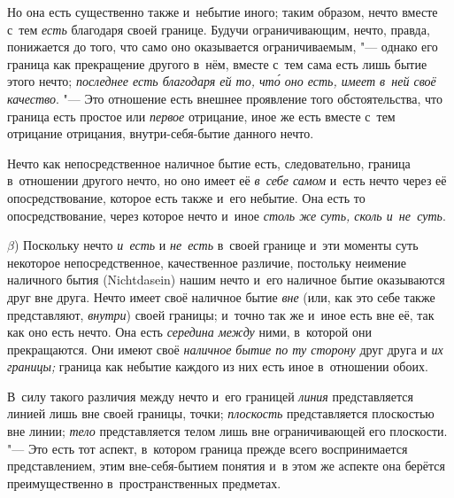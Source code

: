 Но она есть существенно также и~небытие иного; таким образом, нечто вместе
с~тем {\em есть} благодаря своей границе. Будучи ограничивающим, нечто, правда,
понижается до того, что само оно оказывается ограничиваемым, "--- однако его
граница как прекращение другого в~нём, вместе с~тем сама есть лишь бытие этого
нечто; {\em последнее есть благодаря ей то, чт\'{о} оно есть, имеет в~ней своё
качество}. "--- Это отношение есть внешнее проявление того обстоятельства, что
граница есть простое или {\em первое} отрицание, иное же есть вместе с~тем
отрицание отрицания, внутри-себя-бытие данного нечто.

Нечто как непосредственное наличное бытие есть, следовательно, граница
в~отношении другого нечто, но оно имеет её {\em в~себе самом} и~есть нечто
через её опосредствование, которое есть также и~его небытие. Она есть то
опосредствование, через которое нечто и~иное
{\em столь же суть, сколь и~не~суть}.

$\beta$) Поскольку нечто {\em и~есть} и {\em не~есть} в~своей
границе и~эти моменты суть некоторое непосредственное, качественное различие,
постольку неимение наличного бытия (Nicht\-dasein) нашим нечто и~его наличное
бытие оказываются друг вне друга. Нечто имеет своё наличное бытие {\em вне}
(или, как это себе также представляют, {\em внутри}) своей границы; и~точно так
же и~иное есть вне её, так как оно есть нечто. Она есть {\em середина между}
ними, в~которой они прекращаются. Они имеют своё {\em наличное бытие по ту
сторону} друг друга и {\em их границы;} граница как небытие каждого из них есть
иное в~отношении обоих.

В~силу такого различия между нечто и~его границей {\em линия} представляется
линией лишь вне своей границы, точки; {\em плоскость} представляется плоскостью
вне линии; {\em тело} представляется телом лишь вне ограничивающей его
плоскости. "--- Это есть тот аспект, в~котором граница прежде всего
воспринимается представлением, этим вне-себя-бытием понятия и~в этом же аспекте
она берётся преимущественно в~пространственных предметах.

